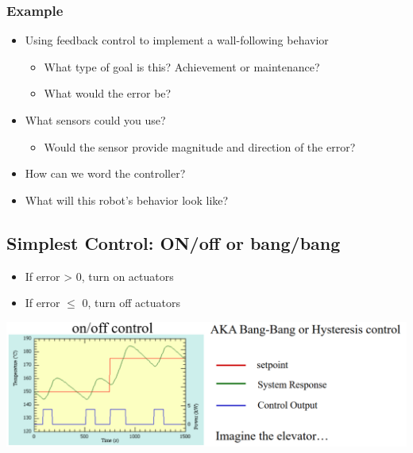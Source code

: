 \documentclass[10pt]{article}
\begin{document}
\subsubsection*{Example}
\begin{itemize}
	\item Using feedback control to implement a wall-following behavior
	\begin{itemize}
        \item What type of goal is this?  Achievement or maintenance?
        \item What would the error be?
    \end{itemize}
	\item What sensors could you use?
	\begin{itemize}
        \item Would the sensor provide magnitude and direction of the error?
    \end{itemize}
	\item How can we word the controller?
	\item What will this robot's behavior look like?
\end{itemize}

\subsection*{Simplest Control: ON/off or bang/bang}
\begin{itemize}
	\item If error > 0, turn on actuators
	\item If error $\leq$ 0, turn off actuators
\end{itemize}
\begin{center} 
	\includegraphics*[width=\textwidth]{L2_7.png} 
\end{center}
\end{document}
